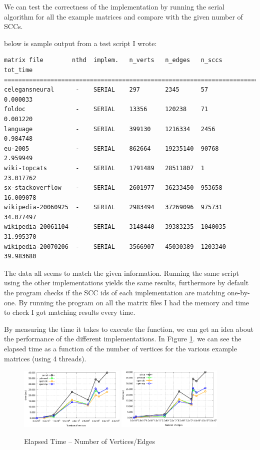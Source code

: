\documentclass[10pt, a4paper]{article}
\begin{document}
We can test the correctness of the implementation by running the serial algorithm for all the example matrices
and compare with the given number of SCCs.

below is sample output from a test script I wrote:
\begin{verbatim}
matrix file        nthd  implem.   n_verts   n_edges   n_sccs    tot_time
==========================================================================
celegansneural      -    SERIAL    297       2345      57        0.000033
foldoc              -    SERIAL    13356     120238    71        0.001220
language            -    SERIAL    399130    1216334   2456      0.984748
eu-2005             -    SERIAL    862664    19235140  90768     2.959949
wiki-topcats        -    SERIAL    1791489   28511807  1         23.017762
sx-stackoverflow    -    SERIAL    2601977   36233450  953658    16.009078
wikipedia-20060925  -    SERIAL    2983494   37269096  975731    34.077497
wikipedia-20061104  -    SERIAL    3148440   39383235  1040035   31.995370
wikipedia-20070206  -    SERIAL    3566907   45030389  1203340   39.983680
\end{verbatim}

The data all seems to match the given information. Running the same script using the other
implementations yields the same results, furthermore by default the program checks if the SCC ids
of each implementation are matching one-by-one. By running the program on all the matrix files I had the
memory and time to check I got matching results every time.

By measuring the time it takes to execute the function, we can get an idea about the performance of the 
different implementations. In Figure \ref{vertices}. we can see the elapsed time as a function of the 
number of vertices for the various example matrices (using 4 threads).

\begin{figure}[h]
	\centering
	\caption{Elapsed Time -- Number of Vertices/Edges}
	\includegraphics[width=0.45\textwidth]{vertices}
	\includegraphics[width=0.45\textwidth]{edges}
	\label{vertices}
\end{figure}
\end{document}
